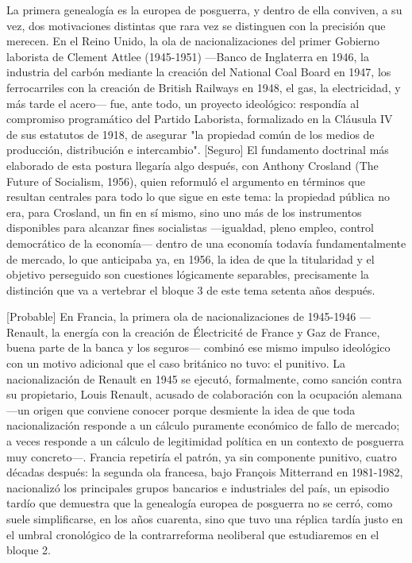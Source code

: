 \documentclass[10pt,a4paper]{article}
\begin{document}
La primera genealogía es la europea de posguerra, y dentro de ella conviven, a su vez, dos motivaciones distintas que rara vez se distinguen con la precisión que merecen. En el Reino Unido, la ola de nacionalizaciones del primer Gobierno laborista de Clement Attlee (1945-1951) —Banco de Inglaterra en 1946, la industria del carbón mediante la creación del National Coal Board en 1947, los ferrocarriles con la creación de British Railways en 1948, el gas, la electricidad, y más tarde el acero— fue, ante todo, un proyecto ideológico: respondía al compromiso programático del Partido Laborista, formalizado en la Cláusula IV de sus estatutos de 1918, de asegurar "la propiedad común de los medios de producción, distribución e intercambio". [Seguro] El fundamento doctrinal más elaborado de esta postura llegaría algo después, con Anthony Crosland (The Future of Socialism, 1956), quien reformuló el argumento en términos que resultan centrales para todo lo que sigue en este tema: la propiedad pública no era, para Crosland, un fin en sí mismo, sino uno más de los instrumentos disponibles para alcanzar fines socialistas —igualdad, pleno empleo, control democrático de la economía— dentro de una economía todavía fundamentalmente de mercado, lo que anticipaba ya, en 1956, la idea de que la titularidad y el objetivo perseguido son cuestiones lógicamente separables, precisamente la distinción que va a vertebrar el bloque 3 de este tema setenta años después.

[Probable] En Francia, la primera ola de nacionalizaciones de 1945-1946 —Renault, la energía con la creación de Électricité de France y Gaz de France, buena parte de la banca y los seguros— combinó ese mismo impulso ideológico con un motivo adicional que el caso británico no tuvo: el punitivo. La nacionalización de Renault en 1945 se ejecutó, formalmente, como sanción contra su propietario, Louis Renault, acusado de colaboración con la ocupación alemana —un origen que conviene conocer porque desmiente la idea de que toda nacionalización responde a un cálculo puramente económico de fallo de mercado; a veces responde a un cálculo de legitimidad política en un contexto de posguerra muy concreto—. Francia repetiría el patrón, ya sin componente punitivo, cuatro décadas después: la segunda ola francesa, bajo François Mitterrand en 1981-1982, nacionalizó los principales grupos bancarios e industriales del país, un episodio tardío que demuestra que la genealogía europea de posguerra no se cerró, como suele simplificarse, en los años cuarenta, sino que tuvo una réplica tardía justo en el umbral cronológico de la contrarreforma neoliberal que estudiaremos en el bloque 2.
\end{document}
